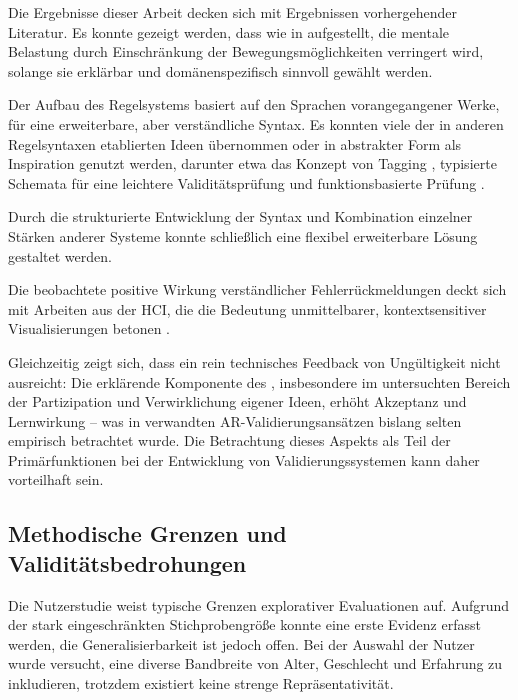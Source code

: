 Die Ergebnisse dieser Arbeit decken sich mit Ergebnissen vorhergehender Literatur. Es konnte gezeigt werden, dass wie in \textcite{stuerzlingerValueConstraints3D2011a} aufgestellt, die mentale Belastung durch Einschränkung der Bewegungsmöglichkeiten verringert wird, solange sie erklärbar und domänenspezifisch sinnvoll gewählt werden.

Der Aufbau des Regelsystems basiert auf den Sprachen vorangegangener Werke, für eine erweiterbare, aber verständliche Syntax. Es konnten viele der in anderen Regelsyntaxen etablierten Ideen übernommen oder in abstrakter Form als Inspiration genutzt werden, darunter etwa das Konzept von Tagging \parencite{xuMethodologyModelling3D2017}, typisierte Schemata für eine leichtere Validitätsprüfung \parencite{mernikWhenHowDevelop2005} und funktionsbasierte Prüfung \parencite{sydoraRulebasedComplianceChecking2020}.

Durch die strukturierte Entwicklung der Syntax und Kombination einzelner Stärken anderer Systeme konnte schließlich eine flexibel erweiterbare Lösung gestaltet werden.

\medskip

Die beobachtete positive Wirkung verständlicher Fehlerrückmeldungen deckt sich mit Arbeiten aus der HCI, die die Bedeutung unmittelbarer, kontextsensitiver Visualisierungen betonen \parencite{wangUsingVisualFeedback2023}.

Gleichzeitig zeigt sich, dass ein rein technisches Feedback von Ungültigkeit nicht ausreicht: Die erklärende Komponente des , insbesondere im untersuchten Bereich der Partizipation und Verwirklichung eigener Ideen, erhöht Akzeptanz und Lernwirkung – was in verwandten AR-Validierungsansätzen bislang selten empirisch betrachtet wurde. Die Betrachtung dieses Aspekts als Teil der Primärfunktionen bei der Entwicklung von Validierungssystemen kann daher vorteilhaft sein.

\subsection{Methodische Grenzen und Validitätsbedrohungen}


Die Nutzerstudie weist typische Grenzen explorativer Evaluationen auf. Aufgrund der stark eingeschränkten Stichprobengröße konnte eine erste Evidenz erfasst werden, die Generalisierbarkeit ist jedoch offen. Bei der Auswahl der Nutzer wurde versucht, eine diverse Bandbreite von Alter, Geschlecht und Erfahrung zu inkludieren, trotzdem existiert keine strenge Repräsentativität.

